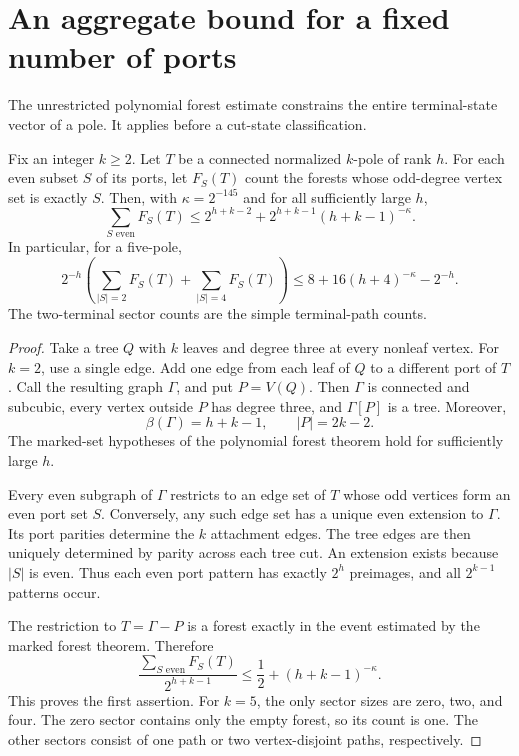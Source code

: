 \section{An aggregate bound for a fixed number of ports}
\label{sec:terminal-aggregate}

The unrestricted polynomial forest estimate constrains the entire terminal-state vector of a pole.
It applies before a cut-state classification.

\begin{theorem}
\label{thm:fixed-port-aggregate}
Fix an integer $k\ge2$.
Let $T$ be a connected normalized $k$-pole of rank $h$.
For each even subset $S$ of its ports, let $F_S(T)$ count the forests whose odd-degree vertex set is exactly $S$.
Then, with $\kappa=2^{-145}$ and for all sufficiently large $h$,
\[
 \sum_{S\text{ even}}F_S(T)
 \le 2^{h+k-2}+2^{h+k-1}(h+k-1)^{-\kappa}.
\]
In particular, for a five-pole,
\[
 2^{-h}\left(\sum_{|S|=2}F_S(T)+\sum_{|S|=4}F_S(T)\right)
 \le8+16(h+4)^{-\kappa}-2^{-h}.
\]
The two-terminal sector counts are the simple terminal-path counts.
\end{theorem}

\begin{proof}
Take a tree $Q$ with $k$ leaves and degree three at every nonleaf vertex.
For $k=2$, use a single edge.
Add one edge from each leaf of $Q$ to a different port of $T$.
Call the resulting graph $\Gamma$, and put $P=V(Q)$.
Then $\Gamma$ is connected and subcubic, every vertex outside $P$ has degree three, and $\Gamma[P]$ is a tree.
Moreover,
\[
 \beta(\Gamma)=h+k-1,
 \qquad |P|=2k-2.
\]
The marked-set hypotheses of the polynomial forest theorem hold for sufficiently large $h$.

Every even subgraph of $\Gamma$ restricts to an edge set of $T$ whose odd vertices form an even port set $S$.
Conversely, any such edge set has a unique even extension to $\Gamma$.
Its port parities determine the $k$ attachment edges.
The tree edges are then uniquely determined by parity across each tree cut.
An extension exists because $|S|$ is even.
Thus each even port pattern has exactly $2^h$ preimages, and all $2^{k-1}$ patterns occur.

The restriction to $T=\Gamma-P$ is a forest exactly in the event estimated by the marked forest theorem.
Therefore
\[
 \frac{\sum_{S\text{ even}}F_S(T)}{2^{h+k-1}}
 \le\frac12+(h+k-1)^{-\kappa}.
\]
This proves the first assertion.
For $k=5$, the only sector sizes are zero, two, and four.
The zero sector contains only the empty forest, so its count is one.
The other sectors consist of one path or two vertex-disjoint paths, respectively.
\end{proof}

